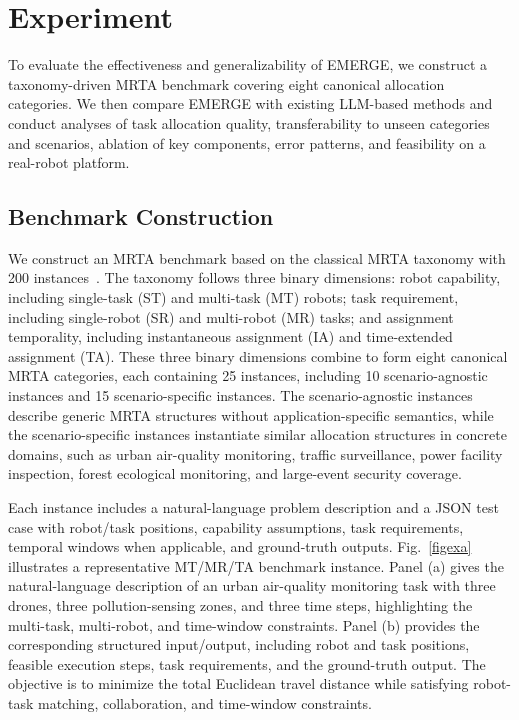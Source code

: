 \documentclass[letterpaper,journal]{IEEEtran}
\begin{document}
\section{Experiment}
To evaluate the effectiveness and generalizability of EMERGE, we construct a taxonomy-driven MRTA benchmark covering eight canonical allocation categories. We then compare EMERGE with existing LLM-based methods and conduct analyses of task allocation quality, transferability to unseen categories and scenarios, ablation of key components, error patterns, and feasibility on a real-robot platform.



\subsection{Benchmark Construction}

We construct an MRTA benchmark based on the classical MRTA taxonomy with 200 instances~\cite{korsah2013comprehensive}. The taxonomy follows three binary dimensions: robot capability, including single-task (ST) and multi-task (MT) robots; task requirement, including single-robot (SR) and multi-robot (MR) tasks; and assignment temporality, including instantaneous assignment (IA) and time-extended assignment (TA). These three binary dimensions combine to form eight canonical MRTA categories, each containing 25 instances, including 10 scenario-agnostic instances and 15 scenario-specific instances. The scenario-agnostic instances describe generic MRTA structures without application-specific semantics, while the scenario-specific instances instantiate similar allocation structures in concrete domains, such as urban air-quality monitoring, traffic surveillance, power facility inspection, forest ecological monitoring, and large-event security coverage.


Each instance includes a natural-language problem description and a JSON test case with robot/task positions, capability assumptions, task requirements, temporal windows when applicable, and ground-truth outputs. Fig.~\ref{figexa} illustrates a representative MT/MR/TA benchmark instance. Panel (a) gives the natural-language description of an urban air-quality monitoring task with three drones, three pollution-sensing zones, and three time steps, highlighting the multi-task, multi-robot, and time-window constraints. Panel (b) provides the corresponding structured input/output, including robot and task positions, feasible execution steps, task requirements, and the ground-truth output. The objective is to minimize the total Euclidean travel distance while satisfying robot-task matching, collaboration, and time-window constraints.
\end{document}
